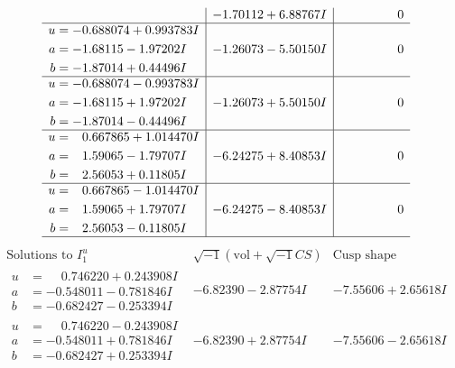 \documentclass[1p]{elsarticle_modified}
\theoremstyle{definition}
\newcommand{\I}{\sqrt{-1}}
\begin{document}
$$\begin{array}{c|c|c}
 & -1.70112 + 6.88767 I & \phantom{-0.000000 } 0 \\ \hline\begin{aligned}
u &= -0.688074 + 0.993783 I \\
a &= -1.68115 - 1.97202 I \\
b &= -1.87014 + 0.44496 I\end{aligned}
 & -1.26073 - 5.50150 I & \phantom{-0.000000 } 0 \\ \hline\begin{aligned}
u &= -0.688074 - 0.993783 I \\
a &= -1.68115 + 1.97202 I \\
b &= -1.87014 - 0.44496 I\end{aligned}
 & -1.26073 + 5.50150 I & \phantom{-0.000000 } 0 \\ \hline\begin{aligned}
u &= \phantom{-}0.667865 + 1.014470 I \\
a &= \phantom{-}1.59065 - 1.79707 I \\
b &= \phantom{-}2.56053 + 0.11805 I\end{aligned}
 & -6.24275 + 8.40853 I & \phantom{-0.000000 } 0 \\ \hline\begin{aligned}
u &= \phantom{-}0.667865 - 1.014470 I \\
a &= \phantom{-}1.59065 + 1.79707 I \\
b &= \phantom{-}2.56053 - 0.11805 I\end{aligned}
 & -6.24275 - 8.40853 I & \phantom{-0.000000 } 0\\
 \hline 
 \end{array}$$\newpage$$\begin{array}{c|c|c}  
\text{Solutions to }I^u_{1}& \I (\text{vol} + \sqrt{-1}CS) & \text{Cusp shape}\\
 \hline 
\begin{aligned}
u &= \phantom{-}0.746220 + 0.243908 I \\
a &= -0.548011 - 0.781846 I \\
b &= -0.682427 - 0.253394 I\end{aligned}
 & -6.82390 - 2.87754 I & -7.55606 + 2.65618 I \\ \hline\begin{aligned}
u &= \phantom{-}0.746220 - 0.243908 I \\
a &= -0.548011 + 0.781846 I \\
b &= -0.682427 + 0.253394 I\end{aligned}
 & -6.82390 + 2.87754 I & -7.55606 - 2.65618 I \\ \hline\begin{aligned}

\end{aligned}
\end{array}$$
\end{document}
